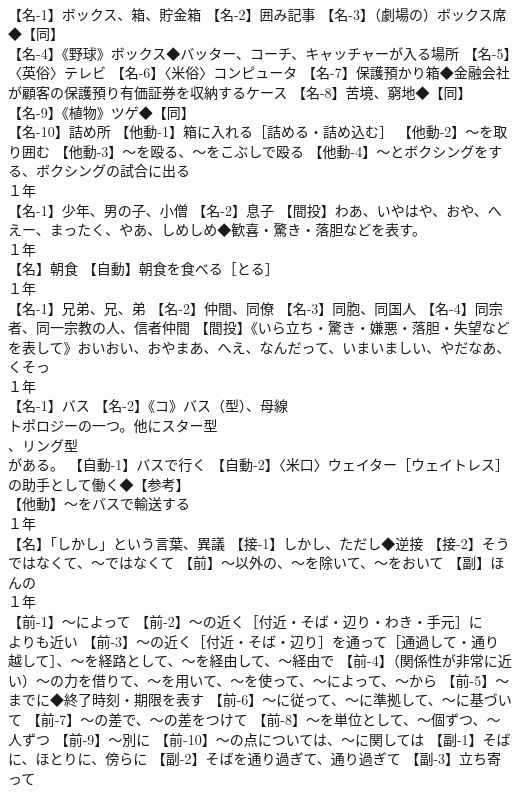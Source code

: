\documentclass[8pt]{extreport}
\begin{document}
\begin{CJK}{UTF8}{min}
\\	【名-1】ボックス、箱、貯金箱 【名-2】囲み記事 【名-3】（劇場の）ボックス席◆【同】
\\	【名-4】《野球》ボックス◆バッター、コーチ、キャッチャーが入る場所 【名-5】〈英俗〉テレビ 【名-6】〈米俗〉コンピュータ 【名-7】保護預かり箱◆金融会社が顧客の保護預り有価証券を収納するケース 【名-8】苦境、窮地◆【同】
\\	【名-9】《植物》ツゲ◆【同】
\\	【名-10】詰め所 【他動-1】箱に入れる［詰める・詰め込む］ 【他動-2】～を取り囲む 【他動-3】～を殴る、～をこぶしで殴る 【他動-4】～とボクシングをする、ボクシングの試合に出る
\\	１年	
\\	【名-1】少年、男の子、小僧 【名-2】息子 【間投】わあ、いやはや、おや、へえー、まったく、やあ、しめしめ◆歓喜・驚き・落胆などを表す。
\\	１年	
\\	【名】朝食 【自動】朝食を食べる［とる］
\\	１年	
\\	【名-1】兄弟、兄、弟 【名-2】仲間、同僚 【名-3】同胞、同国人 【名-4】同宗者、同一宗教の人、信者仲間 【間投】《いら立ち・驚き・嫌悪・落胆・失望などを表して》おいおい、おやまあ、へえ、なんだって、いまいましい、やだなあ、くそっ
\\	１年	
\\	【名-1】バス 【名-2】《コ》バス（型）、母線
\\	トポロジーの一つ。他にスター型
\\	、リング型
\\	がある。 【自動-1】バスで行く 【自動-2】〈米口〉ウェイター［ウェイトレス］の助手として働く◆【参考】
\\	【他動】～をバスで輸送する
\\	１年	
\\	【名】「しかし」という言葉、異議 【接-1】しかし、ただし◆逆接 【接-2】そうではなくて、～ではなくて 【前】～以外の、～を除いて、～をおいて 【副】ほんの
\\	１年	
\\	【前-1】～によって 【前-2】～の近く［付近・そば・辺り・わき・手元］に
\\	よりも近い 【前-3】～の近く［付近・そば・辺り］を通って［通過して・通り越して］、～を経路として、～を経由して、～経由で 【前-4】（関係性が非常に近い）～の力を借りて、～を用いて、～を使って、～によって、～から 【前-5】～までに◆終了時刻・期限を表す 【前-6】～に従って、～に準拠して、～に基づいて 【前-7】～の差で、～の差をつけて 【前-8】～を単位として、～個ずつ、～人ずつ 【前-9】～別に 【前-10】～の点については、～に関しては 【副-1】そばに、ほとりに、傍らに 【副-2】そばを通り過ぎて、通り過ぎて 【副-3】立ち寄って

\end{CJK}
\end{document}
